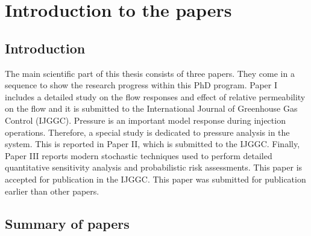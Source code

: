 \chapter{Introduction to the papers}

\pagebreak
\section{Introduction}

The main scientific part of this thesis consists of three papers. They come in a
sequence to show the research progress within this PhD program. Paper
I includes a detailed study on the flow responses and effect of relative
permeability on the flow and it is submitted to the International Journal of
Greenhouse Gas Control (IJGGC). Pressure is an important model response during
injection operations. Therefore, a special study is dedicated to pressure
analysis in the system. This is reported in Paper II, which is submitted to the
IJGGC. Finally, Paper III reports modern stochastic techniques used to perform
detailed quantitative sensitivity analysis and probabilistic risk assessments.
This paper is accepted for publication in the IJGGC. This paper was submitted for publication earlier than other papers.

\section{Summary of papers}

